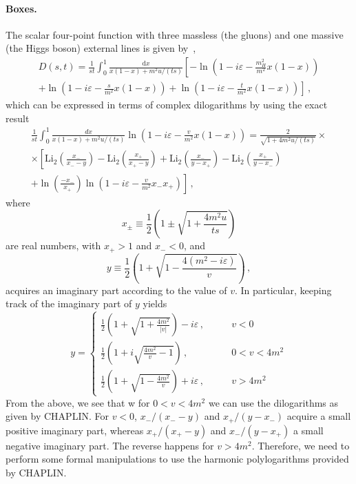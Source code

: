 \documentclass[12pt]{article}
\begin{document}
\paragraph{Boxes.} The scalar four-point function with three massless
(the gluons) and one massive (the Higgs boson) external lines is given
by~\cite{Baur:1989cm},
\begin{multline}
  \label{eq:box}
	D(s, t) = \frac{1}{st} \int_{0}^{1} \frac{\mathrm{d}x}{x(1-x)+m^2u/(ts)} \left [- \ln\left ( 1 - i \varepsilon - \frac{m_H^2}{m^2} x (1-x) \right )\right. \\ \left.
	+ \ln\left ( 1 - i \varepsilon - \frac{s}{m^2} x (1-x) \right ) + \ln\left ( 1 - i \varepsilon - \frac{t}{m^2} x (1-x) \right ) \right ] \,, 
\end{multline}
which can be expressed in terms of complex dilogarithms by using the exact result
\begin{multline}
  \label{eq:ci-dilogs}
  \frac{1}{st} \int_{0}^{1} \frac{dx}{x(1-x)+m^2u/(ts)} \ln\left ( 1 - i \varepsilon - \frac{v}{m^2} x (1-x) \right )= \frac{2}{\sqrt{1+4m^2u/(ts)}} \times  \\ \times
  \left[
    \mathrm{Li}_2\left(\frac{x_-}{x_--y}\right)-\mathrm{Li}_2\left(\frac{x_+}{x_+-y}\right)
    +\mathrm{Li}_2\left(\frac{x_-}{y-x_+}\right)-\mathrm{Li}_2\left(\frac{x_+}{y-x_-}\right)
    \right.
    \\ \left.
    + \ln\left( \frac{-x_{-}}{x_{+}} \right) \ln\left ( 1 - i \varepsilon - \frac{v}{m^2}x_-x_+ \right )
    \right]\,,
  \end{multline}
  where
  \begin{equation}
    \label{eq:xpm}
    	x_{\pm} \equiv \frac{1}{2} \left ( 1 \pm \sqrt{1 + \frac{4m^2 u}{ts}} \right )
  \end{equation}
are real numbers, with $x_{+} > 1$ and $x_{-} < 0$, and
\begin{equation}
  \label{eq:y-def}
  y \equiv \frac{1}{2} \left ( 1 + \sqrt{1 - \frac{4(m^2 - i \varepsilon)}{v}} \right ) \,,
\end{equation}
acquires an imaginary part according to the value of $v$. In particular, keeping track of the imaginary part of $y$ yields
\begin{equation}
  \label{eq:y-implementation}
y = \left\{
  \begin{split}
  \frac{1}{2}\left(1+\sqrt{1+\frac{4m^2}{|v|}}\right)-i\varepsilon\,,& \qquad v<0\\
  \frac{1}{2}\left(1+i\sqrt{\frac{4m^2}{v}-1}\right)\,,& \qquad 0<v<4 m^2\\
    \frac{1}{2}\left(1+\sqrt{1-\frac{4m^2}{v}}\right)+i\varepsilon\,,& \qquad v>4m^2
  \end{split}
  \right.
\end{equation}
From the above, we see that w for $0<v<4 m^2$ we can use the
dilogarithms as given by CHAPLIN.
%
For $v<0$, $x_-/(x_--y)$ and $x_+/(y-x_-)$ acquire a small positive
imaginary part, whereas $x_+/(x_+-y)$ and $x_-/(y-x_+)$ a small
negative imaginary part. The reverse happens for $v>4m^2$. Therefore,
we need to perform some formal manipulations to use the harmonic
polylogarithms provided by CHAPLIN.
\end{document}
